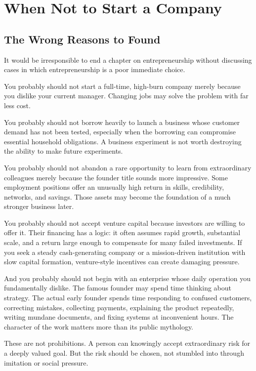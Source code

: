 \section{When Not to Start a Company}

\subsection{The Wrong Reasons to Found}

It would be irresponsible to end a chapter on entrepreneurship without discussing cases in which entrepreneurship is a poor immediate choice.

You probably should not start a full-time, high-burn company merely because you dislike your current manager. Changing jobs may solve the problem with far less cost.

You probably should not borrow heavily to launch a business whose customer demand has not been tested, especially when the borrowing can compromise essential household obligations. A business experiment is not worth destroying the ability to make future experiments.

You probably should not abandon a rare opportunity to learn from extraordinary colleagues merely because the founder title sounds more impressive. Some employment positions offer an unusually high return in skills, credibility, networks, and savings. Those assets may become the foundation of a much stronger business later.

You probably should not accept venture capital because investors are willing to offer it. Their financing has a logic: it often assumes rapid growth, substantial scale, and a return large enough to compensate for many failed investments. If you seek a steady cash-generating company or a mission-driven institution with slow capital formation, venture-style incentives can create damaging pressure.

And you probably should not begin with an enterprise whose daily operation you fundamentally dislike. The famous founder may spend time thinking about strategy. The actual early founder spends time responding to confused customers, correcting mistakes, collecting payments, explaining the product repeatedly, writing mundane documents, and fixing systems at inconvenient hours. The character of the work matters more than its public mythology.

These are not prohibitions. A person can knowingly accept extraordinary risk for a deeply valued goal. But the risk should be chosen, not stumbled into through imitation or social pressure.

